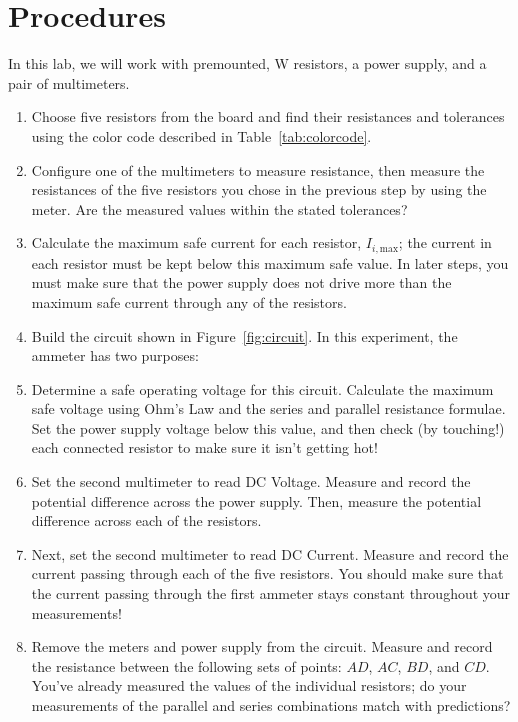 \documentclass[12pt]{article}
\begin{document}
\section{Procedures}
\label{sec:procedures}

In this lab, we will work with premounted, \unit[1]{W} resistors, a
power supply, and a pair of multimeters.  

\begin{enumerate}
\item Choose five resistors from the board and find their resistances
  and tolerances using the color code described in
  Table~\ref{tab:colorcode}.
\item Configure one of the multimeters to measure resistance, then
  measure the resistances of the five resistors you chose in the
  previous step by using the meter.  Are the measured values within
  the stated tolerances?
\item Calculate the maximum safe current for each resistor,
  $I_{i,\mathrm{max}}$; the current in each resistor must be kept
  below this maximum safe value.  In later steps, you must make sure
  that the power supply does not drive more than the maximum safe
  current through any of the resistors.
\item Build the circuit shown in Figure~\ref{fig:circuit}.  In this
  experiment, the ammeter has two purposes:
\item Determine a safe operating voltage for this circuit.  Calculate
  the maximum safe voltage using Ohm's Law and the series and parallel
  resistance formulae.  Set the power supply voltage below this value,
  and then check (by touching!) each connected resistor to make sure
  it isn't getting hot!
\item Set the second multimeter to read DC Voltage.  Measure and
  record the potential difference across the power supply.  Then,
  measure the potential difference across each of the resistors.
\item Next, set the second multimeter to read DC Current.  Measure and
  record the current passing through each of the five resistors.  You
  should make sure that the current passing through the first ammeter
  stays constant throughout your measurements!
\item Remove the meters and power supply from the circuit.  Measure
  and record the resistance between the following sets of points:
  $AD$, $AC$, $BD$, and $CD$.  You've already measured the values of
  the individual resistors; do your measurements of the parallel and
  series combinations match with predictions?
\end{enumerate}
\end{document}
